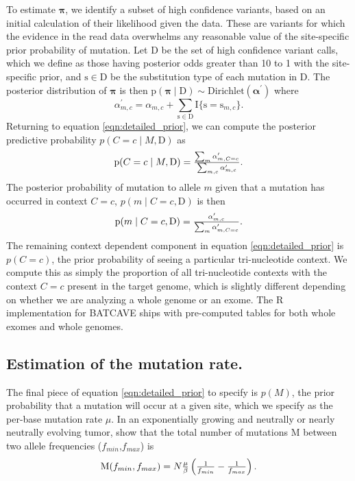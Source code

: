 \documentclass[a4,center,fleqn]{NAR}
\newcommand{\batcave}{BATCAVE }
\begin{document}
To estimate $\boldsymbol{\pi}$, we identify a subset of high confidence variants, based on an initial calculation of their likelihood given the data.
These are variants for which the evidence in the read data overwhelms any reasonable value of the site-specific prior probability of mutation.
Let $\mathrm{D}$ be the set of high confidence variant calls, which we define as those having posterior odds greater than 10 to 1 with the site-specific prior, and $\mathrm{s} \in \mathrm{D}$ be the substitution type of each mutation in $\mathrm{D}$.
The posterior distribution of $\boldsymbol{\pi}$ is then $\mathrm{p}(\boldsymbol{\pi} \mid \mathrm{D}) \sim \textrm{Dirichlet}(\boldsymbol{\alpha^{\prime}})$ where
  $$
    \alpha^{\prime}_{m,c} = \alpha_{m,c} + \sum\limits_{\mathrm{s} \in \mathrm{D}} \mathrm{I}\{\mathrm{s} = \mathrm{s}_{m,c}\}.
  $$
Returning to equation \ref{eqn:detailed_prior}, we can compute the posterior predictive probability $p(C = c \mid M,\mathrm{D})$ as
\begin{equation}
  \label{eqn:post_pred}
  $$
  \mathrm{p}(C = c \mid M,\mathrm{D}) = \frac{\sum_{m}\alpha^{\prime}_{m,C = c}}{\sum_{m,c}\alpha^{\prime}_{m,c}}.
  $$
\end{equation}
The posterior probability of mutation to allele $m$ given that a mutation has occurred in context $C = c$, $p(m  \mid C = c,\mathrm{D})$ is then
\begin{equation}
  \label{eqn:to_allele}
  $$
   \mathrm{p}(m \mid C = c,\mathrm{D}) = \frac{\alpha^{\prime}_{m,c}}{\sum_{m} \alpha^{\prime}_{m,C = c}}.
  $$
\end{equation}
The remaining context dependent component in equation \ref{eqn:detailed_prior} is $p(C = c)$, the prior probability of seeing a particular tri-nucleotide context.
We compute this as simply the proportion of all tri-nucleotide contexts with the context $C = c$ present in the target genome, which is slightly different depending on whether we are analyzing a whole genome or an exome.
The R implementation for \batcave ships with pre-computed tables for both whole exomes and whole genomes.

\subsection{Estimation of the mutation rate.}
The final piece of equation \ref{eqn:detailed_prior} to specify is $p(M)$, the prior probability that a mutation will occur at a given site, which we specify as the per-base mutation rate $\mu$.
In an exponentially growing and neutrally or nearly neutrally evolving tumor, \citet{Williams2018} show that the total number of mutations $\mathrm{M}$ between two allele frequencies ($f_{min}$,$f_{max}$) is
\begin{equation}
  \label{eqn:mut_rate}
$$
  \mathrm{M}(f_{min},f_{max}) = N\frac{\mu}{\beta}\left(\frac{1}{f_{min}} - \frac{1}{f_{max}}\right).
$$
\end{equation}
\end{document}

